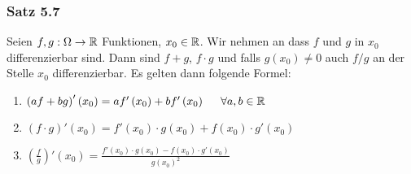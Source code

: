 \subsubsection*{Satz 5.7}
Seien $f,g:\Omega\to\mathbb{R}$ Funktionen, $x_0\in\mathbb{R}$. Wir nehmen an dass $f$ und $g$ in $x_0$ differenzierbar sind. Dann sind $f+g$, $f\cdot g$ und falls $g\left( x_0\right)\not=0$ auch $f/g$ an der Stelle $x_0$ differenzierbar. Es gelten dann folgende Formel:
\begin{enumerate}
\item $\left( {af + bg} \right)'\left( {{x_0}} \right) = af'\left( {{x_0}} \right) + bf'\left( {{x_0}} \right)\hspace{5mm}\forall a,b \in \mathbb{R}$
\item $\left( {f \cdot g} \right)'\left( {{x_0}} \right) = f'\left( {{x_0}} \right) \cdot g\left( {{x_0}} \right) + f\left( {{x_0}} \right) \cdot g'\left( {{x_0}} \right)$
\item $\left( {\frac{f}{g}} \right)'\left( {{x_0}} \right) = \frac{{f'\left( {{x_0}} \right) \cdot g\left( {{x_0}} \right) - f\left( {{x_0}} \right) \cdot g'\left( {{x_0}} \right)}}{{g{{\left( {{x_0}} \right)}^2}}}$
\end{enumerate} 
